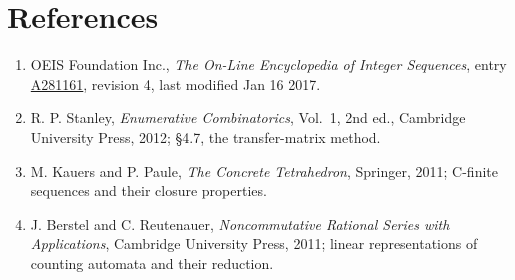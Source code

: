 \documentclass[11pt]{article}
\theoremstyle{definition}
\begin{document}
\section{References}

\begin{enumerate}

\item OEIS Foundation Inc., \emph{The On-Line Encyclopedia of Integer Sequences}, entry \href{https://oeis.org/A281161}{A281161}, revision 4, last modified Jan 16 2017.

\item R. P. Stanley, \emph{Enumerative Combinatorics}, Vol.~1, 2nd ed., Cambridge University Press, 2012; \S4.7, the transfer-matrix method.

\item M. Kauers and P. Paule, \emph{The Concrete Tetrahedron}, Springer, 2011; C-finite sequences and their closure properties.

\item J. Berstel and C. Reutenauer, \emph{Noncommutative Rational Series with Applications}, Cambridge University Press, 2011; linear representations of counting automata and their reduction.

\end{enumerate}
\end{document}

